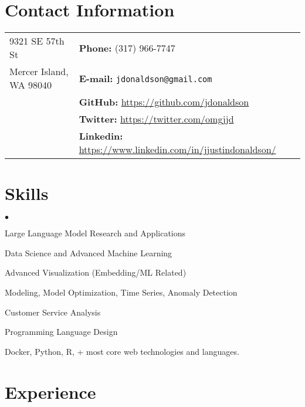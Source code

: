 \documentclass[margin,line]{res}
\newenvironment{list2}{
  \begin{list}{$\bullet$}{%
      \setlength{\itemsep}{0in}
      \setlength{\parsep}{0in} \setlength{\parskip}{0in}
      \setlength{\topsep}{0in} \setlength{\partopsep}{0in} 
      \setlength{\leftmargin}{0.2in}}}{\end{list}}
\begin{document}
\address{\large ML/DS/Engineering Entrepeneur}
\address{\large Above Ventures, LLC}

\begin{resume}
\section{\sc Contact Information}
\vspace{.05in}
\begin{tabular}{@{}p{2in}p{4in}}
9321 SE 57th St          & {\bf Phone:}   (317) 966-7747 \\
Mercer Island, WA 98040  & {\bf E-mail:}  {\tt jdonaldson@gmail.com} \\
                         & {\bf GitHub:} \url{https://github.com/jdonaldson} \\
                         & {\bf Twitter:} \url{https://twitter.com/omgjjd} \\
                         & {\bf Linkedin:} \url{https://www.linkedin.com/in/jjustindonaldson/} \\

\end{tabular}


\section{\sc Skills}
\begin{list2}
\item Large Language Model Research and Applications
\item Data Science and Advanced Machine Learning
\item Advanced Visualization (Embedding/ML Related)
\item Modeling, Model Optimization, Time Series, Anomaly Detection
\item Customer Service Analysis
\item Programming Language Design
\item Docker, Python, R, + most core web technologies and languages.
\end{list2}

\section{\sc Experience}


\end{resume}
\end{document}
